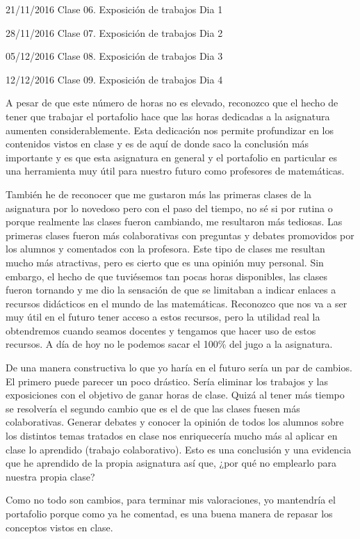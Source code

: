 \begin{leftbar}{\guscolor}
21/11/2016 Clase 06. Exposición de trabajos Dia 1

28/11/2016 Clase 07. Exposición de trabajos Dia 2

05/12/2016 Clase 08. Exposición de trabajos Dia 3

12/12/2016 Clase 09. Exposición de trabajos Dia 4

A pesar de que este número de horas no es elevado, reconozco que el hecho de tener que trabajar el portafolio hace que las horas dedicadas a la asignatura aumenten considerablemente. Esta dedicación nos permite profundizar en los contenidos vistos en clase y es de aquí de donde saco la conclusión más importante y es que esta asignatura en general y el portafolio en particular es una herramienta muy útil para nuestro futuro como profesores de matemáticas.

También he de reconocer que me gustaron más las primeras clases de la asignatura por lo novedoso pero con el paso del tiempo, no sé si por rutina o porque realmente las clases fueron cambiando, me resultaron más tediosas. Las primeras clases fueron más colaborativas con preguntas y debates promovidos por los alumnos y comentados con la profesora. Este tipo de clases me resultan mucho más atractivas, pero es cierto que es una opinión muy personal. Sin embargo, el hecho de que tuviésemos tan pocas horas disponibles, las clases fueron tornando y me dio la sensación de que se limitaban a indicar enlaces a recursos didácticos en el mundo de las matemáticas. Reconozco que nos va a ser muy útil en el futuro tener acceso a estos recursos, pero la utilidad real la obtendremos cuando seamos docentes y tengamos que hacer uso de estos recursos. A día de hoy no le podemos sacar el 100\% del jugo a la asignatura.

De una manera constructiva lo que yo haría en el futuro sería un par de cambios. El primero puede parecer un poco drástico. Sería eliminar los trabajos y las exposiciones con el objetivo de ganar horas de clase. Quizá al tener más tiempo se resolvería el segundo cambio que es el de que las clases fuesen más colaborativas. Generar debates y conocer la opinión de todos los alumnos sobre los distintos temas tratados en clase nos enriquecería mucho más al aplicar en clase lo aprendido (trabajo colaborativo). Esto es una conclusión y una evidencia que he aprendido de la propia asignatura así que, ¿por qué no emplearlo para nuestra propia clase?

Como no todo son cambios, para terminar mis valoraciones, yo mantendría el portafolio porque como ya he comentad, es una buena manera de repasar los conceptos vistos en clase.


\end{leftbar}
